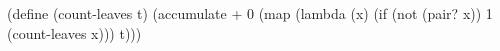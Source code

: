 \begtt\scm
(define (count-leaves t)
  (accumulate + 0 (map (lambda (x)
                         (if (not (pair? x))
                             1
                             (count-leaves x)))
                       t)))
\endtt
